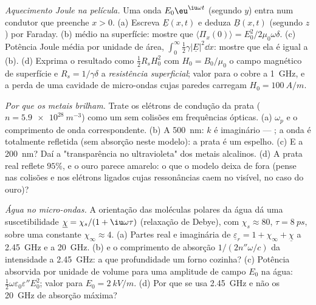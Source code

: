 \begin{exercise}[$\star\star\star$]\label{exo:b2:waves-in-media:10}
\emph{Aquecimento Joule na película.} Uma onda $E_0\eu^{\iu\omega t}$ (segundo $y$)
entra num condutor que preenche $x > 0$. (a) Escreva $\underline E(x, t)$ e deduza
$\underline B(x, t)$ (segundo $z$) por Faraday. (b)  médio na
superfície: mostre que $\langle\Pi_x(0)\rangle = E_0^2/2\mu_0\omega\delta$. (c) Potência
Joule média por unidade de área, $\int_0^\infty\tfrac12\gamma|\underline E|^2\dd x$: mostre que ela é igual a
(b). (d) Exprima o resultado como $\tfrac12R_sH_0^2$ com $H_0 = B_0/\mu_0$ o
campo magnético de superfície e $R_s = 1/\gamma\delta$ a \emph{resistência
superficial}; valor para o cobre a \qty{1}{GHz}, e a perda de uma
cavidade de micro-ondas cujas paredes carregam $H_0 = \qty{100}{A/m}$.
\end{exercise}

\begin{exercise}[$\star\star\star$]\label{exo:b2:waves-in-media:11}
\emph{Por que os metais brilham.} Trate os elétrons de condução da prata ($n =
\qty{5.9e28}{m^{-3}}$) como um  sem colisões em frequências ópticas.
(a) $\omega_p$ e o comprimento de onda correspondente. (b) A \qty{500}{nm}: $k$ é
imaginário --- ; a onda é totalmente refletida (sem
absorção neste modelo): a prata é um espelho. (c) E a \qty{200}{nm}? Daí
a "transparência no ultravioleta" dos metais alcalinos. (d) A prata real
reflete $95\%$, e o ouro parece amarelo: o que o modelo deixa de fora (pense nas
colisões e nos elétrons ligados cujas ressonâncias caem no
visível, no caso do ouro)?
\end{exercise}

\begin{exercise}[$\star\star\star$]\label{exo:b2:waves-in-media:12}
\emph{Água no micro-ondas.} A orientação das moléculas polares da água
dá uma suscetibilidade $\underline\chi = \chi_s/(1 + \iu\omega\tau)$ (relaxação de
Debye), com $\chi_s \approx 80$, $\tau = \qty{8}{ps}$, sobre uma constante
$\chi_\infty \approx 4$. (a) Partes real e imaginária de $\underline\varepsilon_r = 1 + \chi_\infty
+ \underline\chi$ a \qty{2.45}{GHz} e a \qty{20}{GHz}. (b)  e o
comprimento de absorção $1/(2n''\omega/c)$ da intensidade a \qty{2.45}{GHz}: a que
profundidade um forno cozinha? (c) Potência absorvida por unidade de volume para uma
amplitude de campo $E_0$ na água: $\tfrac12\omega\varepsilon_0\varepsilon''E_0^2$; valor para
$E_0 = \qty{2}{kV/m}$. (d) Por que se usa \qty{2.45}{GHz} e não os
\qty{20}{GHz} de absorção máxima?
\end{exercise}

